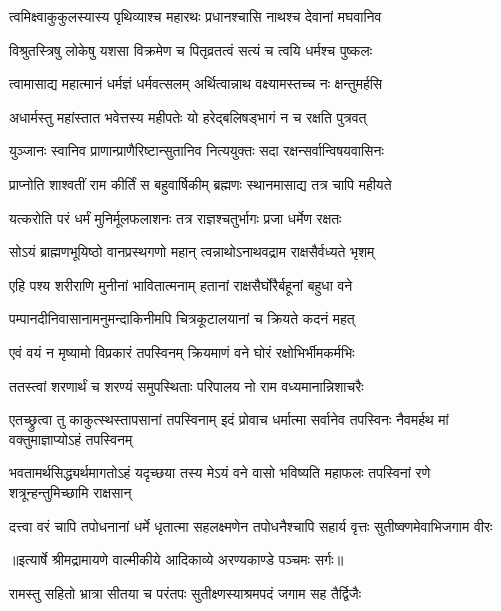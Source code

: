\twolineshloka
{त्वमिक्ष्वाकुकुलस्यास्य पृथिव्याश्च महारथः}
{प्रधानश्चासि नाथश्च देवानां मघवानिव} %

\twolineshloka
{विश्रुतस्त्रिषु लोकेषु यशसा विक्रमेण च}
{पितृव्रतत्वं सत्यं च त्वयि धर्मश्च पुष्कलः} %

\twolineshloka
{त्वामासाद्य महात्मानं धर्मज्ञं धर्मवत्सलम्}
{अर्थित्वान्नाथ वक्ष्यामस्तच्च नः क्षन्तुमर्हसि} %

\twolineshloka
{अधार्मस्तु महांस्तात भवेत्तस्य महीपतेः}
{यो हरेद्बलिषड्भागं न च रक्षति पुत्रवत्} %

\twolineshloka
{युञ्जानः स्वानिव प्राणान्प्राणैरिष्टान्सुतानिव}
{नित्ययुक्तः सदा रक्षन्सर्वान्विषयवासिनः} %

\twolineshloka
{प्राप्नोति शाश्वतीं राम कीर्तिं स बहुवार्षिकीम्}
{ब्रह्मणः स्थानमासाद्य तत्र चापि महीयते} %

\twolineshloka
{यत्करोति परं धर्मं मुनिर्मूलफलाशनः}
{तत्र राज्ञश्चतुर्भागः प्रजा धर्मेण रक्षतः} %

\twolineshloka
{सोऽयं ब्राह्मणभूयिष्ठो वानप्रस्थगणो महान्}
{त्वन्नाथोऽनाथवद्राम राक्षसैर्वध्यते भृशम्} %

\twolineshloka
{एहि पश्य शरीराणि मुनीनां भावितात्मनाम्}
{हतानां राक्षसैर्घोरैर्बहूनां बहुधा वने} %

\twolineshloka
{पम्पानदीनिवासानामनुमन्दाकिनीमपि}
{चित्रकूटालयानां च क्रियते कदनं महत्} %

\twolineshloka
{एवं वयं न मृष्यामो विप्रकारं तपस्विनम्}
{क्रियमाणं वने घोरं रक्षोभिर्भीमकर्मभिः} %

\twolineshloka
{ततस्त्वां शरणार्थं च शरण्यं समुपस्थिताः}
{परिपालय नो राम वध्यमानान्निशाचरैः} %

\threelineshloka
{एतच्छ्रुत्वा तु काकुत्स्थस्तापसानां तपस्विनाम्}
{इदं प्रोवाच धर्मात्मा सर्वानेव तपस्विनः}
{नैवमर्हथ मां वक्तुमाज्ञाप्योऽहं तपस्विनम्} %

\threelineshloka
{भवतामर्थसिद्ध्यर्थमागतोऽहं यदृच्छया}
{तस्य मेऽयं वने वासो भविष्यति महाफलः}
{तपस्विनां रणे शत्रून्हन्तुमिच्छामि राक्षसान्} %

\fourlineindentedshloka
{दत्त्वा वरं चापि तपोधनानां}
{ धर्मे धृतात्मा सहलक्ष्मणेन}
{तपोधनैश्चापि सहार्य वृत्तः}
{ सुतीष्क्णमेवाभिजगाम वीरः} %


{॥इत्यार्षे श्रीमद्रामायणे वाल्मीकीये आदिकाव्ये अरण्यकाण्डे पञ्चमः सर्गः॥}


\twolineshloka
{रामस्तु सहितो भ्रात्रा सीतया च परंतपः}
{सुतीक्ष्णस्याश्रमपदं जगाम सह तैर्द्विजैः} %

